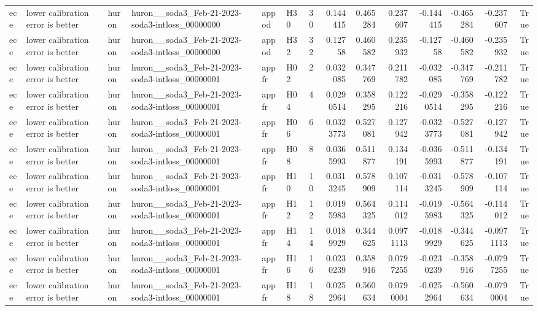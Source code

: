 \begin{longtable}{llllllrrrrrrrr}
ece & lower calibration error is better & huron & huron\_\_soda3\_Feb-21-2023-soda3-intloss\_00000000 & appod & H30 & 30 & 0.144415 & 0.465284 & 0.237607 & -0.144415 & -0.465284 & -0.237607 & True \\
ece & lower calibration error is better & huron & huron\_\_soda3\_Feb-21-2023-soda3-intloss\_00000000 & appod & H32 & 32 & 0.12758 & 0.460582 & 0.235932 & -0.12758 & -0.460582 & -0.235932 & True \\
ece & lower calibration error is better & huron & huron\_\_soda3\_Feb-21-2023-soda3-intloss\_00000001 & appfr & H02 & 2 & 0.032085 & 0.347769 & 0.211782 & -0.032085 & -0.347769 & -0.211782 & True \\
ece & lower calibration error is better & huron & huron\_\_soda3\_Feb-21-2023-soda3-intloss\_00000001 & appfr & H04 & 4 & 0.0290514 & 0.358295 & 0.122216 & -0.0290514 & -0.358295 & -0.122216 & True \\
ece & lower calibration error is better & huron & huron\_\_soda3\_Feb-21-2023-soda3-intloss\_00000001 & appfr & H06 & 6 & 0.0323773 & 0.527081 & 0.127942 & -0.0323773 & -0.527081 & -0.127942 & True \\
ece & lower calibration error is better & huron & huron\_\_soda3\_Feb-21-2023-soda3-intloss\_00000001 & appfr & H08 & 8 & 0.0365993 & 0.511877 & 0.134191 & -0.0365993 & -0.511877 & -0.134191 & True \\
ece & lower calibration error is better & huron & huron\_\_soda3\_Feb-21-2023-soda3-intloss\_00000001 & appfr & H10 & 10 & 0.0313245 & 0.578909 & 0.107114 & -0.0313245 & -0.578909 & -0.107114 & True \\
ece & lower calibration error is better & huron & huron\_\_soda3\_Feb-21-2023-soda3-intloss\_00000001 & appfr & H12 & 12 & 0.0195983 & 0.564325 & 0.114012 & -0.0195983 & -0.564325 & -0.114012 & True \\
ece & lower calibration error is better & huron & huron\_\_soda3\_Feb-21-2023-soda3-intloss\_00000001 & appfr & H14 & 14 & 0.0189929 & 0.344625 & 0.0971113 & -0.0189929 & -0.344625 & -0.0971113 & True \\
ece & lower calibration error is better & huron & huron\_\_soda3\_Feb-21-2023-soda3-intloss\_00000001 & appfr & H16 & 16 & 0.0230239 & 0.358916 & 0.0797255 & -0.0230239 & -0.358916 & -0.0797255 & True \\
ece & lower calibration error is better & huron & huron\_\_soda3\_Feb-21-2023-soda3-intloss\_00000001 & appfr & H18 & 18 & 0.0252964 & 0.560634 & 0.0790004 & -0.0252964 & -0.560634 & -0.0790004 & True \\

\end{longtable}
